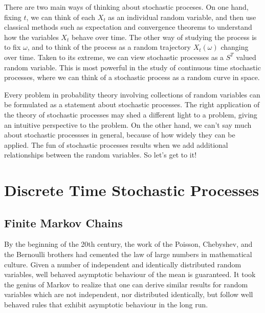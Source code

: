 There are two main ways of thinking about stochastic proceses. On one hand, fixing $t$, we can think of each $X_t$ as an individual random variable, and then use classical methods such as expectation and convergence theorems to understand how the variables $X_t$ behave over time. The other way of studying the process is to fix $\omega$, and to think of the process as a random trajectory $X_t(\omega)$ changing over time. Taken to its extreme, we can view stochastic processes as a $S^T$ valued random variable. This is most powerful in the study of continuous time stochastic processes, where we can think of a stochastic process as a random curve in space.

Every problem in probability theory involving collections of random variables can be formulated as a statement about stochastic processes. The right application of the theory of stochastic processes may shed a different light to a problem, giving an intuitive perspective to the problem. On the other hand, we can't say much about stochastic processses in general, because of how widely they can be applied. The fun of stochastic processes results when we add additional relationships between the random variables. So let's get to it!

\part{Discrete Time Stochastic Processes}

\chapter{Finite Markov Chains}

By the beginning of the 20th century, the work of the Poisson, Chebyshev, and the Bernoulli brothers had cemented the law of large numbers in mathematical culture. Given a number of independent and identically distributed random variables, well behaved asymptotic behaviour of the mean is guaranteed. It took the genius of Markov to realize that one can derive similar results for random variables which are not independent, nor distributed identically, but follow well behaved rules that exhibit asymptotic behaviour in the long run.


